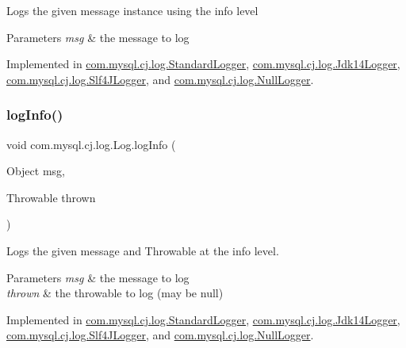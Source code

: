 Logs the given message instance using the \textquotesingle{}info\textquotesingle{} level


\begin{DoxyParams}{Parameters}
{\em msg} & the message to log \\
\hline
\end{DoxyParams}


Implemented in \mbox{\hyperlink{classcom_1_1mysql_1_1cj_1_1log_1_1_standard_logger_aeeb1226e65e7183722939e8ae666a910}{com.\+mysql.\+cj.\+log.\+Standard\+Logger}}, \mbox{\hyperlink{classcom_1_1mysql_1_1cj_1_1log_1_1_jdk14_logger_afb7e72826582a918eb3ec8b14549a7d0}{com.\+mysql.\+cj.\+log.\+Jdk14\+Logger}}, \mbox{\hyperlink{classcom_1_1mysql_1_1cj_1_1log_1_1_slf4_j_logger_a3444f6e7cb48a80d3cf82acf93a74c27}{com.\+mysql.\+cj.\+log.\+Slf4\+J\+Logger}}, and \mbox{\hyperlink{classcom_1_1mysql_1_1cj_1_1log_1_1_null_logger_a26d58956fed92b00593c66b1d7d3fed0}{com.\+mysql.\+cj.\+log.\+Null\+Logger}}.

\mbox{\label{interfacecom_1_1mysql_1_1cj_1_1log_1_1_log_abad2a5a44ff04b24bf46a58997e4f7da}} 
\subsubsection{\texorpdfstring{log\+Info()}{logInfo()}\hspace{0.1cm}{\footnotesize\ttfamily [2/2]}}
{\footnotesize\ttfamily void com.\+mysql.\+cj.\+log.\+Log.\+log\+Info (\begin{DoxyParamCaption}\item[{Object}]{msg,  }\item[{Throwable}]{thrown }\end{DoxyParamCaption})}

Logs the given message and Throwable at the \textquotesingle{}info\textquotesingle{} level.


\begin{DoxyParams}{Parameters}
{\em msg} & the message to log \\
\hline
{\em thrown} & the throwable to log (may be null) \\
\hline
\end{DoxyParams}


Implemented in \mbox{\hyperlink{classcom_1_1mysql_1_1cj_1_1log_1_1_standard_logger_a9086549846486165e052a7e1ce190864}{com.\+mysql.\+cj.\+log.\+Standard\+Logger}}, \mbox{\hyperlink{classcom_1_1mysql_1_1cj_1_1log_1_1_jdk14_logger_a439d3b7c7b21fd3f766bed9729e77551}{com.\+mysql.\+cj.\+log.\+Jdk14\+Logger}}, \mbox{\hyperlink{classcom_1_1mysql_1_1cj_1_1log_1_1_slf4_j_logger_ad6eaf1dfaaa8f7f4c7a092852a4add0f}{com.\+mysql.\+cj.\+log.\+Slf4\+J\+Logger}}, and \mbox{\hyperlink{classcom_1_1mysql_1_1cj_1_1log_1_1_null_logger_a0dc09cf6b7ae8266a850c79bc226e714}{com.\+mysql.\+cj.\+log.\+Null\+Logger}}.

